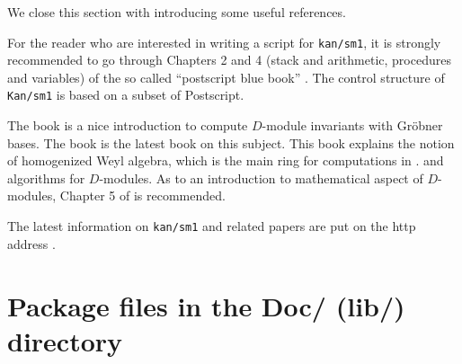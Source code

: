 \medbreak

We close this section with introducing some useful references.

For the reader who are interested in writing a script for {\tt kan/sm1},
it is strongly recommended to go through Chapters 2 and 4
(stack and arithmetic, procedures and variables) of the so called
``postscript blue book'' \cite{Postscript}.
The control structure of {\tt Kan/sm1} is based on a subset of
Postscript.

The book \cite{Oaku} is a nice introduction to compute $D$-module invariants
with Gr\"obner bases. 
The book \cite{SST} is the latest book on this subject.
This book explains the notion of homogenized Weyl algebra,
which is the main ring for computations in \kansm.
and algorithms for $D$-modules.
As to an introduction to mathematical aspect of $D$-modules, 
Chapter 5 of \cite{Hotta} is recommended.

The latest information on {\tt kan/sm1} and related papers are put on the
http address \cite{www}.

\section{Package files in the Doc/ (lib/) directory}

